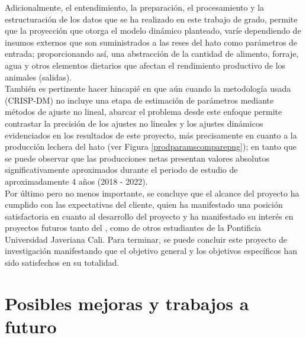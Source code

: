 Adicionalmente, el entendimiento, la preparación, el procesamiento y la estructuración de los datos que se ha realizado en este trabajo de grado, permite que la proyección que otorga el modelo dinámico planteado, varíe dependiendo de insumos externos que son suministrados a las reses del hato como parámetros de entrada; proporcionando así, una abstracción de la cantidad de alimento, forraje, agua y otros elementos dietarios que afectan el rendimiento productivo de los animales (salidas).\\

También es pertinente hacer hincapié en que aún cuando la metodología usada (CRISP-DM) no incluye una etapa de estimación de parámetros mediante métodos de ajuste no lineal, abarcar el problema desde este enfoque permite contrastar la precisión de los ajustes no lineales y los ajustes dinámicos evidenciados en los resultados de este proyecto, más precisamente en cuanto a la producción lechera del hato (ver Figura \ref{prodparamscomparepng}); en tanto que se puede observar que las producciones netas presentan valores absolutos significativamente aproximados durante el periodo de estudio de aproximadamente 4 años (2018 - 2022).\\

Por último pero no menos importante, se concluye que el alcance del proyecto ha cumplido con las expectativas del cliente, quien ha manifestado una posición satisfactoria en cuanto al desarrollo del proyecto y ha manifestado su interés en proyectos futuros tanto del \authorA, como de otros estudiantes de la Pontificia Universidad Javeriana Cali. Para terminar, se puede concluir este proyecto de investigación manifestando que el objetivo general y los objetivos específicos han sido satisfechos en su totalidad.









\section{Posibles mejoras y trabajos a futuro}


